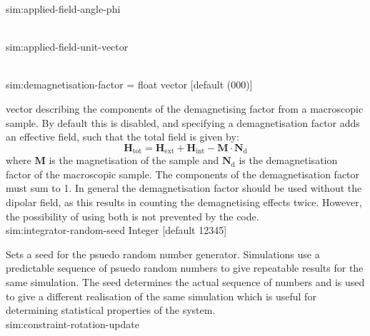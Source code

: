 {\zicf sim:applied-field-angle-phi}\\

{\zicf sim:applied-field-unit-vector}\\

{\zicf sim:demagnetisation-factor = float vector [default (000)]} vector describing the components of the demagnetising factor from a macroscopic sample. By default this is disabled, and specifying a demagnetisation factor adds an effective field, such that the total field is given by:
\begin{equation*}
\mathbf{H}_{\mathrm{tot}} = \mathbf{H}_{\mathrm{ext}} + \mathbf{H}_{\mathrm{int}} - \mathbf{M} \cdot \mathbf{N}_{\mathrm{d}}
\end{equation*}
where $\mathbf{M}$ is the magnetisation of the sample and $\mathbf{N}_{\mathrm{d}}
$ is the demagnetisation factor of the macroscopic sample. The components of the demagnetisation factor must sum to 1. In general the demagnetisation factor should be used without the dipolar field, as this results in counting the demagnetising effects twice. However, the possibility of using both is not prevented by the code.\\



{\zicf sim:integrator-random-seed
    Integer [default 12345]}
    Sets a seed for the psuedo random number generator. Simulations use a predictable sequence of psuedo random numbers to give repeatable results for the same simulation. The seed determines the actual sequence of numbers and is used to give a different realisation of the same simulation which is useful for determining statistical properties of the system.\\

{\zicf sim:constraint-rotation-update}\\


